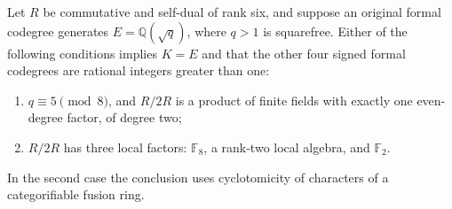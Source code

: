 \begin{proposition}
\label{prop:r3-local-isolation}
Let $R$ be commutative and self-dual of rank six, and suppose an
original formal codegree generates $E=\mathbb Q(\sqrt q)$, where
$q>1$ is squarefree. Either of the following conditions implies
$K=E$ and that the other four signed formal codegrees are rational
integers greater than one:
\begin{enumerate}
\item $q\equiv5\pmod8$, and $R/2R$ is a product of finite fields
with exactly one even-degree factor, of degree two;
\item $R/2R$ has three local factors: $\mathbb F_8$, a rank-two
local algebra, and $\mathbb F_2$.
\end{enumerate}
In the second case the conclusion uses cyclotomicity of characters
of a categorifiable fusion ring.
\end{proposition}
